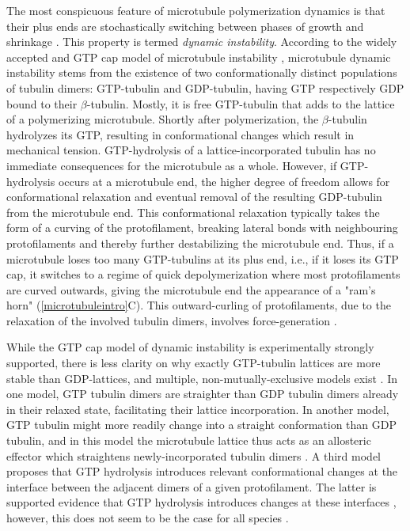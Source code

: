 The most conspicuous feature of microtubule polymerization dynamics is that their plus ends are stochastically switching between phases of growth and shrinkage \parencite{Janosi2002}. This property is termed \textit{dynamic instability}. According to the widely accepted and GTP cap model of microtubule instability , microtubule dynamic instability stems from the existence of two conformationally distinct populations of tubulin dimers: GTP-tubulin and GDP-tubulin, having GTP respectively GDP bound to their $\beta$-tubulin. Mostly, it is free GTP-tubulin that adds to the lattice of a polymerizing microtubule. Shortly after polymerization, the $\beta$-tubulin hydrolyzes its GTP, resulting in conformational changes which result in mechanical tension. GTP-hydrolysis of a lattice-incorporated tubulin has no immediate consequences for the microtubule as a whole. However, if GTP-hydrolysis occurs at a microtubule end, the higher degree of freedom allows for conformational relaxation and eventual removal of the resulting GDP-tubulin from the microtubule end. This conformational relaxation typically takes the form of a curving of the protofilament, breaking lateral bonds with neighbouring protofilaments and thereby further destabilizing the microtubule end. Thus, if a microtubule loses too many GTP-tubulins at its plus end, i.e., if it loses its GTP cap, it switches to a regime of quick depolymerization where most protofilaments are curved outwards, giving the microtubule end the appearance of a "ram's horn" (\autoref{microtubuleintro}C). This outward-curling of protofilaments, due to the relaxation of the involved tubulin dimers, involves force-generation .\par 

While the GTP cap model of dynamic instability is experimentally strongly supported, there is less clarity on why exactly GTP-tubulin lattices are more stable than GDP-lattices, and multiple, non-mutually-exclusive models exist . In one model, GTP tubulin dimers are straighter than GDP tubulin dimers already in their relaxed state, facilitating their lattice incorporation. In another model, GTP tubulin might more readily change into a straight conformation than GDP tubulin, and in this model the microtubule lattice thus acts as an allosteric effector which straightens newly-incorporated tubulin dimers . A third model proposes that GTP hydrolysis introduces relevant conformational changes at the interface between the adjacent dimers of a given protofilament. The latter is supported evidence that GTP hydrolysis introduces changes at these interfaces , however, this does not seem to be the case for all species \cite{Cross2019}.\par

